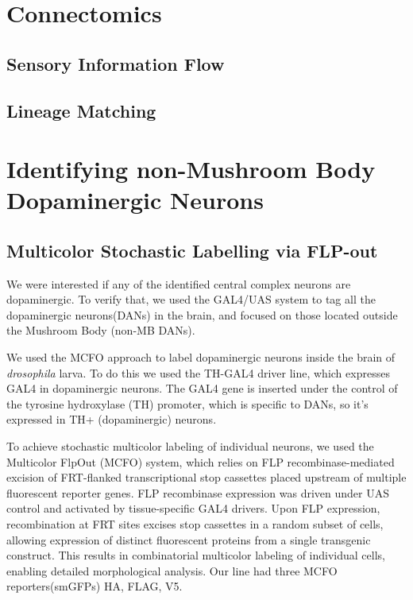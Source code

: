 \section{Connectomics}
\subsection{Sensory Information Flow}
\subsection{Lineage Matching}


\section{Identifying non-Mushroom Body Dopaminergic Neurons}
    \subsection{Multicolor Stochastic Labelling via FLP-out} 
    We were interested if any of the identified central complex neurons are dopaminergic. To verify that, we used the GAL4/UAS system to tag all the dopaminergic neurons(DANs) in the brain, and focused on those located outside the Mushroom Body (non-MB DANs).

    We used the MCFO approach to label dopaminergic neurons inside the brain of \textit{drosophila} larva. To do this we used the TH-GAL4 driver line, which expresses GAL4 in dopaminergic neurons. The GAL4 gene is inserted under the control of the tyrosine hydroxylase (TH) promoter, which is specific to DANs, so it’s expressed in TH+ (dopaminergic) neurons.


    To achieve stochastic multicolor labeling of individual neurons, we used the Multicolor Flp\-Out (MCFO) system, which relies on FLP recombinase-mediated excision of FRT-flanked transcriptional stop cassettes placed upstream of multiple fluorescent reporter genes. FLP recombinase expression was driven under UAS control and activated by tissue-specific GAL4 drivers. Upon FLP expression, recombination at FRT sites excises stop cassettes in a random subset of cells, allowing expression of distinct fluorescent proteins from a single transgenic construct. This results in combinatorial multicolor labeling of individual cells, enabling detailed morphological analysis.
    Our line had three MCFO reporters(smGFPs) \- HA, FLAG, V5.

